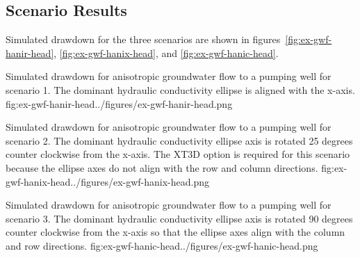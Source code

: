\subsection{Scenario Results}

Simulated drawdown for the three scenarios are shown in figures~\ref{fig:ex-gwf-hanir-head},  \ref{fig:ex-gwf-hanix-head}, and \ref{fig:ex-gwf-hanic-head}.

\begin{StandardFigure}{
                                     Simulated drawdown for anisotropic groundwater flow to a pumping well for scenario 1.  The dominant hydraulic conductivity ellipse is aligned with the x-axis.
                                     }{fig:ex-gwf-hanir-head}{../figures/ex-gwf-hanir-head.png}
\end{StandardFigure}                                 

\begin{StandardFigure}{
                                     Simulated drawdown for anisotropic groundwater flow to a pumping well for scenario 2.  The dominant hydraulic conductivity ellipse axis is rotated 25 degrees counter clockwise from the x-axis.  The XT3D option is required for this scenario because the ellipse axes do not align with the row and column directions.
                                     }{fig:ex-gwf-hanix-head}{../figures/ex-gwf-hanix-head.png}
\end{StandardFigure}                                 

\begin{StandardFigure}{
                                     Simulated drawdown for anisotropic groundwater flow to a pumping well for scenario 3.  The dominant hydraulic conductivity ellipse axis is rotated 90 degrees counter clockwise from the x-axis so that the ellipse axes align with the column and row directions.
                                     }{fig:ex-gwf-hanic-head}{../figures/ex-gwf-hanic-head.png}
\end{StandardFigure}                                 


                
